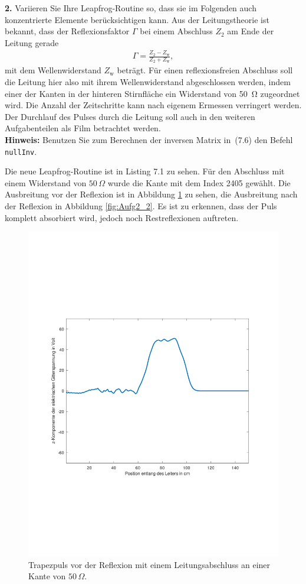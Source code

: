 \documentclass[Protokollheft.tex]{subfiles}
\begin{document}
\begin{framed}
	\noindent \textbf{2.} Variieren Sie Ihre Leapfrog-Routine so, dass sie im
Folgenden auch konzentrierte Elemente berücksichtigen kann. Aus der Leitungstheorie 
ist bekannt, dass der Reflexionsfaktor $\Gamma$ bei einem Abschluss $Z_{\text{2}}$ am Ende der Leitung gerade 
\begin{align}
 \Gamma=\frac{Z_{\text{2}}-Z_{\text{w}}}{Z_{\text{2}}+Z_{\text{w}}},
\end{align}
mit dem Wellenwiderstand $Z_{\text{w}}$ beträgt. Für einen reflexionsfreien Abschluss soll die 
Leitung hier also mit ihrem Wellenwiderstand abgeschlossen werden,
indem einer der Kanten in der hinteren Stirnfläche ein Widerstand
von \SI{50}{\ohm} zugeordnet wird. Die Anzahl der Zeitschritte kann nach
eigenem Ermessen verringert werden. Der Durchlauf des Pulses durch
die Leitung soll auch in den weiteren Aufgabenteilen als Film
betrachtet werden.\label{exer:simIncludeLumped}\\
\textbf{Hinweis:} Benutzen Sie zum Berechnen der inversen Matrix 
in~(7.6) den Befehl \verb|nullInv|.
%
\end{framed}
\noindent
Die neue Leapfrog-Routine ist in Listing 7.1 zu sehen. Für den Abschluss mit einem Widerstand von $50\,\Omega$ wurde die Kante mit dem Index 2405 gewählt. Die Ausbreitung vor der Reflexion ist in Abbildung \ref{fig:Aufg2_1} zu sehen, die Ausbreitung nach der Reflexion in Abbildung \ref{fig:Aufg2_2}. Es ist zu erkennen, dass der Puls komplett absorbiert wird, jedoch noch Restreflexionen auftreten.
\newpage

\begin{figure}[ht]
	\centering
	\includegraphics[trim = 20mm 65mm 20mm 65mm, clip,width=0.7\linewidth]{Aufgabe2_1.pdf}
	\caption{Trapezpuls vor der Reflexion mit einem Leitungsabschluss an einer Kante von $50\,\Omega$.}\label{fig:Aufg2_1}
\end{figure}
\end{document}
